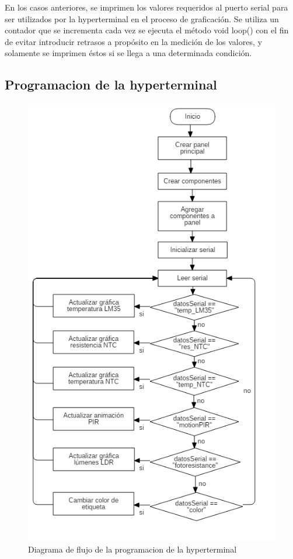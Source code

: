 \documentclass[conference]{IEEEtran}
\begin{document}
En los casos anteriores, se imprimen los valores requeridos al puerto serial para ser utilizados por la hyperterminal en el proceso de graficación. Se utiliza un contador que se incrementa cada vez se ejecuta el método void loop() con el fin de evitar introducir retrasos a propósito en la medición de los valores, y solamente se imprimen éstos si se llega a una determinada condición.

\subsection{Programacion de la hyperterminal}
\begin{figure}
  \includegraphics[width=\linewidth]{fig2_diagram_Hyperterminal.png}
  \caption{Diagrama de flujo de la programacion de la hyperterminal}
  \label{fig:flowDiagram2}
\end{figure}
\end{document}
